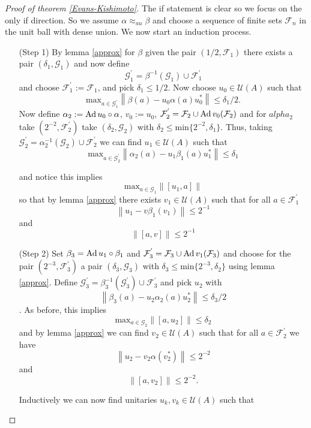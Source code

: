 \documentclass[11pt,a4paper,oneside]{amsart}
\newcommand{\Ad}{{\rm Ad\,}}
\newcommand{\norm}[1]{\left\|#1\right\|} %
\begin{document}
\begin{proof}[Proof of theorem \ref{Evans-Kishimoto}] The if statement is clear so we focus on the only if direction. So we assume $\alpha \approx_{au} \beta$ and choose a sequence of finite sets $\mathcal F_n$ in the unit ball with dense union. We now start an induction process. \begin{enumerate}
\item[(Step 1)] By lemma \ref{approx} for $\beta$ given the pair $(1/2, \mathcal F_1)$ there exists a pair $(\delta_1, \mathcal G_1)$ and now define $$\mathcal G^{'}_1= \beta^{-1}(\mathcal G_1)\cup \mathcal F_1^{'}$$ and choose $\mathcal F_1^{'}:= \mathcal F_1$, and pick $\delta_1\leq 1/2$. Now choose $u_0\in \mathcal U (A)$ such that  $$\mathrm{max}_ {a\in \mathcal G_1^{'}}\norm {\beta(a)-u_0\alpha(a)u_0^*}\leq \delta_1/2.$$ Now define $\alpha_2:= \Ad u_0 \circ \alpha$, $v_0:= u_0$,  $\mathcal F_2^{'}= \mathcal F_2\cup \Ad v_0(\mathcal F_2)$ and for $alpha_2$ take $(2^{-2}, \mathcal F_2^{'})$ take $(\delta_2, \mathcal G_2)$ with $\delta_2\leq \mathrm{min}\{2^{-2}, \delta_1\}$. Thus, taking $\mathcal G_2^{'}=\alpha_2^{-1}(\mathcal G_2)\cup \mathcal F_2^{' }$ we can find $u_1\in \mathcal U (A)$ such that $$\mathrm{max}_{a\in \mathcal G_2^{'}}\norm {\alpha_2(a)-u_1\beta_1(a)u_1^*}\leq \delta_1$$

and notice this implies $$\mathrm{max}_{a\in \mathcal G_1}\norm{[u_1, a]}$$ so that by lemma \ref{approx} there exists $v_1\in \mathcal U(A)$ such that for all $a\in \mathcal F_1^{'}$ $$\norm{u_1-v\beta_1(v_1)}\leq 2^{-1}$$ and $$\norm{[a,v]}\leq 2^{-1}$$

\item[(Step 2)] Set $\beta_3= \Ad u_1\circ \beta_1$ and $\mathcal F_3^{'}=\mathcal F_3\cup \Ad v_1(\mathcal F_3)$ and choose for the pair $(2^{-3}, \mathcal F_3^{'})$ a pair $(\delta_3, \mathcal G_3)$ with $\delta_3\leq \mathrm{min}\{2^{-3}, \delta_2\}$ using lemma \ref{approx}. Define $\mathcal G_3 ^{'}= \beta_3^{-1}(\mathcal G_3 ^{'})\cup \mathcal F_3 ^{'}$ and pick $u_2$ with $$\norm{\beta_3(a)- u_2\alpha_2(a)u_2^*}\leq \delta_3/2$$. As before, this implies $$\mathrm{max}_{a\in \mathcal G_2}\norm{[a,u_2]}\leq \delta_2$$ and by lemma \ref{approx} we can find $v_2\in \mathcal U(A)$ such that for all $a\in \mathcal F_2^{'}$ we have $$\norm{u_2-v_2\alpha(v_2^*)}\leq 2^{-2}$$ and $$\norm{[a, v_2]}\leq 2^{-2}.$$

Inductively we can now find unitaries $u_k, v_k \in \mathcal U(A)$ such that 


\end{enumerate}
\end{proof}
\end{document}
